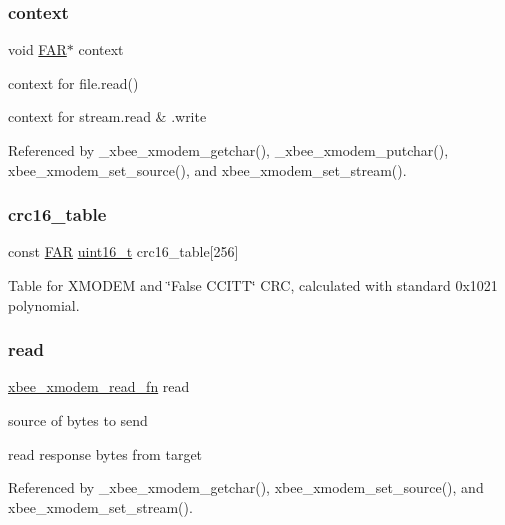 \subsubsection{\texorpdfstring{context}{context}}
{\footnotesize\ttfamily void \hyperlink{group__hal_gaef060b3456fdcc093a7210a762d5f2ed}{F\+AR}$\ast$ context}



context for file.\+read() 

context for stream.\+read \& .write 

Referenced by \+\_\+xbee\+\_\+xmodem\+\_\+getchar(), \+\_\+xbee\+\_\+xmodem\+\_\+putchar(), xbee\+\_\+xmodem\+\_\+set\+\_\+source(), and xbee\+\_\+xmodem\+\_\+set\+\_\+stream().

\mbox{\label{group__util__xmodem_gab903230030042c3ee444aa887b705e06}} 
\subsubsection{\texorpdfstring{crc16\+\_\+table}{crc16\_table}}
{\footnotesize\ttfamily const \hyperlink{group__hal_gaef060b3456fdcc093a7210a762d5f2ed}{F\+AR} \hyperlink{group__hal__dos_ga5a8b2dc9e45a9ee81a94ef304fb62505}{uint16\+\_\+t} crc16\+\_\+table\mbox{[}256\mbox{]}}



Table for X\+M\+O\+D\+EM and \char`\"{}\+False C\+C\+I\+T\+T\char`\"{} C\+RC, calculated with standard 0x1021 polynomial. 

\mbox{\label{group__util__xmodem_gac73e7e9b654a58e232f8c1380cd68dfa}} 
\subsubsection{\texorpdfstring{read}{read}}
{\footnotesize\ttfamily \hyperlink{group__util__xmodem_ga25f49dbd4c2f9e274a32217a709d6382}{xbee\+\_\+xmodem\+\_\+read\+\_\+fn} read}



source of bytes to send 

read response bytes from target 

Referenced by \+\_\+xbee\+\_\+xmodem\+\_\+getchar(), xbee\+\_\+xmodem\+\_\+set\+\_\+source(), and xbee\+\_\+xmodem\+\_\+set\+\_\+stream().

